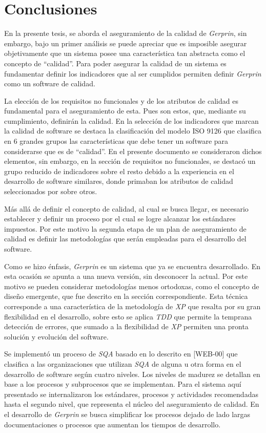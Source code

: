 
\chapter{Conclusiones }

En la presente tesis, se aborda el aseguramiento de la calidad de \emph{Gerprin}, sin embargo, bajo un primer análisis se puede apreciar que es imposible asegurar objetivamente que un sistema posee una característica tan abstracta como el concepto de “calidad”. Para poder asegurar la calidad de un sistema es fundamentar definir los indicadores que al ser cumplidos permiten definir \emph{Gerprin} como un software de calidad.

La elección de los requisitos no funcionales y de los atributos de calidad es fundamental para el aseguramiento de esta. Pues son estos, que, mediante su cumplimiento, definirán la calidad. En la selección de los indicadores que marcan la calidad de software se destaca la clasificación del modelo ISO 9126 que clasifica en 6 grandes grupos las características que debe tener un software para considerarse que es de “calidad”. En el presente documento se consideraron dichos elementos, sin embargo, en la sección de requisitos no funcionales, se destacó un grupo reducido de indicadores sobre el resto debido a la experiencia en el desarrollo de software similares, donde primaban los atributos de calidad seleccionados por sobre otros.

Más allá de definir el concepto de calidad, al cual se busca llegar, es necesario establecer y definir un proceso por el cual se logre alcanzar los estándares impuestos. Por este motivo la segunda etapa de un plan de aseguramiento de calidad es definir las metodologías que serán empleadas para el desarrollo del software. 

Como se hizo énfasis, \emph{Gerprin} es un sistema que ya se encuentra desarrollado. En esta ocasión se apunta a una nueva versión, sin desconocer la actual. Por este motivo se pueden considerar metodologías menos ortodoxas, como el concepto de diseño emergente, que fue descrito en la sección correspondiente. Esta técnica corresponde a una característica de la metodología de \emph{XP} que resalta por su gran flexibilidad en el desarrollo, sobre esto se aplica \emph{TDD} que permite la temprana detección de errores, que sumado a la flexibilidad de \emph{XP} permiten una pronta solución y evolución del software.

Se implementó un proceso de \emph{SQA} basado en lo descrito en [WEB-00] que clasifica a las organizaciones que utilizan \emph{SQA} de alguna u otra forma en el desarrollo de software según cuatro niveles. Los niveles de madurez se detallan en base a los procesos y subprocesos que se implementan. Para el sistema aquí presentado se internalizaron los estándares, procesos y actividades recomendadas hasta el segundo nivel, que representa el núcleo del aseguramiento de calidad. En el desarrollo de \emph{Gerprin} se busca simplificar los procesos dejado de lado largas documentaciones o procesos que aumentan los tiempos de desarrollo. 

